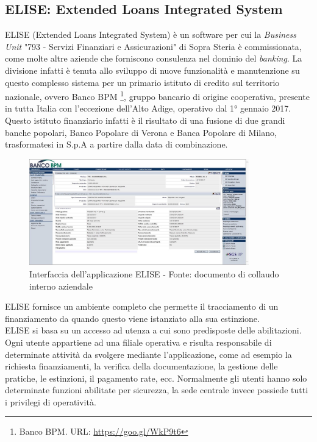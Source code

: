 \subsection{ELISE: Extended Loans Integrated System}

	ELISE (Extended Loans Integrated System) è un software per cui la \textit{Business Unit} "793 - Servizi Finanziari e Assicurazioni" di Sopra Steria è commissionata, come molte altre aziende che forniscono consulenza nel dominio del \textit{banking}. La divisione infatti è tenuta allo sviluppo di nuove funzionalità e manutenzione su questo complesso sistema per un primario istituto di credito sul territorio nazionale, ovvero Banco BPM \footnote{Banco BPM. URL: \url{https://goo.gl/WkP9t6}}, gruppo bancario di origine cooperativa, presente in tutta Italia con l'eccezione dell'Alto Adige, operativo dal \ang{1} gennaio 2017. Questo istituto finanziario infatti è il risultato di una fusione di due grandi banche popolari, Banco Popolare di Verona e Banca Popolare di Milano, trasformatesi in S.p.A a partire dalla data di combinazione.\\

	\begin{figure}[H]
		\centering
	   	\includegraphics[width=0.85\textwidth]{immagini/Elise}
	   	\caption{Interfaccia dell'applicazione ELISE - Fonte: documento di collaudo interno aziendale}
	\end{figure}

	ELISE fornisce un ambiente completo che permette il tracciamento di un finanziamento da quando questo viene istanziato alla sua estinzione.\\
	
	ELISE si basa su un accesso ad utenza a cui sono predisposte delle abilitazioni. Ogni utente appartiene ad una filiale operativa e risulta responsabile di determinate attività da svolgere mediante l'applicazione, come ad esempio la richiesta finanziamenti, la verifica della documentazione, la gestione delle pratiche, le estinzioni, il pagamento rate, ecc. Normalmente gli utenti hanno solo determinate funzioni abilitate per sicurezza, la sede centrale invece possiede tutti i privilegi di operatività.\\
	
